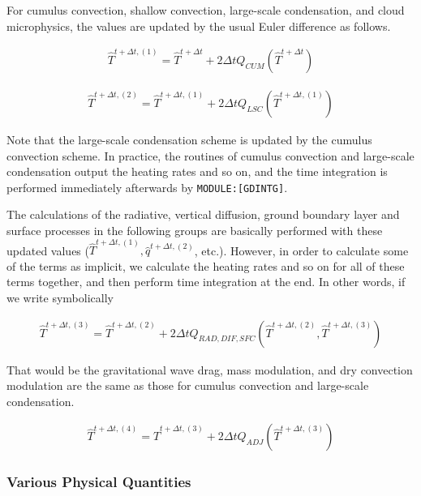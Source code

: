 For cumulus convection, shallow convection, large-scale condensation, and cloud microphysics, the values are updated by the usual Euler difference as follows.

\begin{eqnarray}
  \hat{T}^{t+\Delta t,(1)} = \hat{T}^{t+\Delta t}
                         +  2 \Delta t Q_{CUM}(\hat{T}^{t+\Delta t})
\end{eqnarray}

\begin{eqnarray}
  \hat{T}^{t+\Delta t,(2)} = \hat{T}^{t+\Delta t,(1)}
                         +  2 \Delta t Q_{LSC}(\hat{T}^{t+\Delta t,(1)})
\end{eqnarray}

Note that the large-scale condensation scheme is updated by the cumulus convection scheme. In practice, the routines of cumulus convection and large-scale condensation output the heating rates and so
on, and the time integration is performed immediately afterwards by \texttt{MODULE:{[}GDINTG{]}}.

The calculations of the radiative, vertical diffusion, ground boundary layer and surface processes in the following groups are basically performed with these updated values
(\(\hat{T}^{t+\Delta t,(1)}, \hat{q}^{t+\Delta t,(2)}\), etc.). However, in order to calculate some of the terms as implicit, we calculate the heating rates and so on for all of these terms together,
and then perform time integration at the end. In other words, if we write symbolically

\begin{eqnarray}
  \hat{T}^{t+\Delta t,(3)} = \hat{T}^{t+\Delta t,(2)}
              + 2 \Delta t Q_{RAD,DIF,SFC}
               (\hat{T}^{t+\Delta t,(2)},\hat{T}^{t+\Delta t,(3)})
\end{eqnarray}

That would be the gravitational wave drag, mass modulation, and dry convection modulation are the same as those for cumulus convection and large-scale condensation.

\begin{eqnarray}
  \hat{T}^{t+\Delta t,(4)} = \hat{T}^{t+\Delta t,(3)}
              +  2 \Delta t Q_{ADJ}(\hat{T}^{t+\Delta t,(3)})
\end{eqnarray}

\hypertarget{various-physical-quantities}{%
\subsubsection{Various Physical Quantities}\label{various-physical-quantities}}

